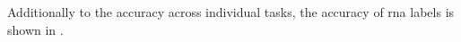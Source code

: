 
Additionally to the accuracy across individual tasks, the
accuracy of \gls{rna} labels is shown in . 
